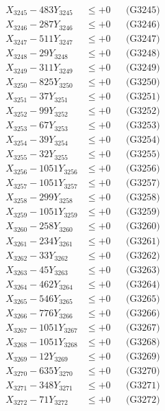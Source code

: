 \documentclass[a4paper,10pt]{article}
\begin{document}
{\begin{align}
X_{3245} - 483Y_{3245} &\leq +0 && \text{(G3245)} \\
X_{3246} - 287Y_{3246} &\leq +0 && \text{(G3246)} \\
X_{3247} - 511Y_{3247} &\leq +0 && \text{(G3247)} \\
X_{3248} - 29Y_{3248} &\leq +0 && \text{(G3248)} \\
X_{3249} - 311Y_{3249} &\leq +0 && \text{(G3249)} \\
X_{3250} - 825Y_{3250} &\leq +0 && \text{(G3250)} \\
\allowbreak
X_{3251} - 37Y_{3251} &\leq +0 && \text{(G3251)} \\
X_{3252} - 99Y_{3252} &\leq +0 && \text{(G3252)} \\
X_{3253} - 67Y_{3253} &\leq +0 && \text{(G3253)} \\
X_{3254} - 39Y_{3254} &\leq +0 && \text{(G3254)} \\
X_{3255} - 32Y_{3255} &\leq +0 && \text{(G3255)} \\
X_{3256} - 1051Y_{3256} &\leq +0 && \text{(G3256)} \\
X_{3257} - 1051Y_{3257} &\leq +0 && \text{(G3257)} \\
X_{3258} - 299Y_{3258} &\leq +0 && \text{(G3258)} \\
X_{3259} - 1051Y_{3259} &\leq +0 && \text{(G3259)} \\
X_{3260} - 258Y_{3260} &\leq +0 && \text{(G3260)} \\
\allowbreak
X_{3261} - 234Y_{3261} &\leq +0 && \text{(G3261)} \\
X_{3262} - 33Y_{3262} &\leq +0 && \text{(G3262)} \\
X_{3263} - 45Y_{3263} &\leq +0 && \text{(G3263)} \\
X_{3264} - 462Y_{3264} &\leq +0 && \text{(G3264)} \\
X_{3265} - 546Y_{3265} &\leq +0 && \text{(G3265)} \\
X_{3266} - 776Y_{3266} &\leq +0 && \text{(G3266)} \\
X_{3267} - 1051Y_{3267} &\leq +0 && \text{(G3267)} \\
X_{3268} - 1051Y_{3268} &\leq +0 && \text{(G3268)} \\
X_{3269} - 12Y_{3269} &\leq +0 && \text{(G3269)} \\
X_{3270} - 635Y_{3270} &\leq +0 && \text{(G3270)} \\
\allowbreak
X_{3271} - 348Y_{3271} &\leq +0 && \text{(G3271)} \\
X_{3272} - 71Y_{3272} &\leq +0 && \text{(G3272)} \\

\end{align}}
\end{document}
